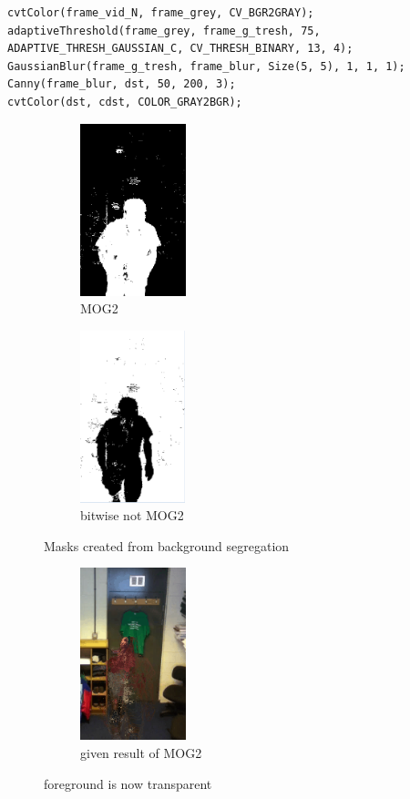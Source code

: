 \documentclass{article}
\begin{document}
\begin{lstlisting}
cvtColor(frame_vid_N, frame_grey, CV_BGR2GRAY);
adaptiveThreshold(frame_grey, frame_g_tresh, 75, ADAPTIVE_THRESH_GAUSSIAN_C, CV_THRESH_BINARY, 13, 4);
GaussianBlur(frame_g_tresh, frame_blur, Size(5, 5), 1, 1, 1);
Canny(frame_blur, dst, 50, 200, 3);
cvtColor(dst, cdst, COLOR_GRAY2BGR);

\end{lstlisting}






\begin{figure}[H]
	\begin{subfigure}{0.5\textwidth}
		\includegraphics[width=0.5\linewidth, height=5cm]{door_mask.PNG} 
		\caption{MOG2}
		\label{fig:subim1}
	\end{subfigure}
	\begin{subfigure}{0.5\textwidth}
		\includegraphics[width=0.5\linewidth, height=5cm]{door_neg_mask.PNG}
		\caption{bitwise not MOG2}
		\label{fig:subim2}
	\end{subfigure}
	\caption{Masks created from background segregation}
	\label{fig:image2}
\end{figure}



\begin{figure}[H]
\center
\begin{subfigure}{0.5\textwidth}
\includegraphics[width=0.5\linewidth, height=5cm]{door_back_proj.PNG} 
\caption{given result of MOG2}
\label{fig:subim1}
\end{subfigure}
\caption{foreground is now transparent}
\label{fig:image2}
\end{figure}
\end{document}
